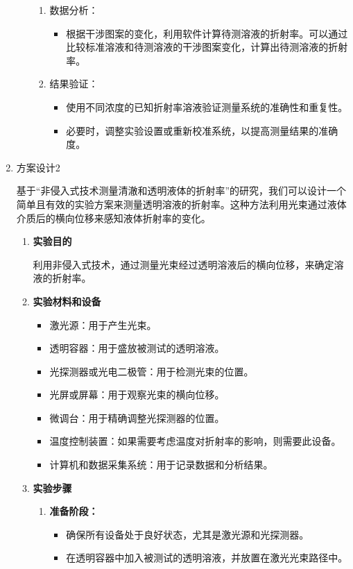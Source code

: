 \documentclass[dvipsnames, svgnames,a4paper,11pt]{article}
\begin{document}
\begin{enumerate}
\begin{enumerate}
\begin{enumerate}
				\item 数据分析：
				\begin{itemize}
					\item 根据干涉图案的变化，利用软件计算待测溶液的折射率。可以通过比较标准溶液和待测溶液的干涉图案变化，计算出待测溶液的折射率。
				\end{itemize}
				
				\item 结果验证：
				\begin{itemize}
					\item 使用不同浓度的已知折射率溶液验证测量系统的准确性和重复性。
					\item 必要时，调整实验设置或重新校准系统，以提高测量结果的准确度。
				\end{itemize}
			\end{enumerate}
		\end{enumerate}
		
		\item 方案设计2
		
		基于“非侵入式技术测量清澈和透明液体的折射率”的研究，我们可以设计一个简单且有效的实验方案来测量透明溶液的折射率。这种方法利用光束通过液体介质后的横向位移来感知液体折射率的变化。
		
		\begin{enumerate}
			\item \textbf{实验目的}
			
			利用非侵入式技术，通过测量光束经过透明溶液后的横向位移，来确定溶液的折射率。
			
			\item \textbf{实验材料和设备}
			
			\begin{itemize}
				\item 激光源：用于产生光束。
				\item 透明容器：用于盛放被测试的透明溶液。
				\item 光探测器或光电二极管：用于检测光束的位置。
				\item 光屏或屏幕：用于观察光束的横向位移。
				\item 微调台：用于精确调整光探测器的位置。
				\item 温度控制装置：如果需要考虑温度对折射率的影响，则需要此设备。
				\item 计算机和数据采集系统：用于记录数据和分析结果。
			\end{itemize}
			
			\item \textbf{实验步骤}
			\begin{enumerate}
				\item \textbf{准备阶段：}
				\begin{itemize}
					\item 确保所有设备处于良好状态，尤其是激光源和光探测器。
					\item 在透明容器中加入被测试的透明溶液，并放置在激光光束路径中。
				\end{itemize}
				

\end{enumerate}
\end{enumerate}
\end{enumerate}
\end{document}
